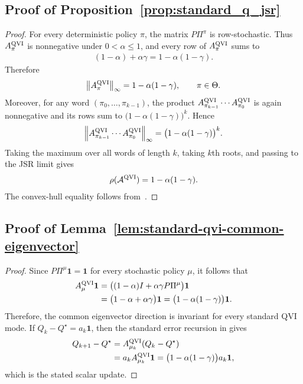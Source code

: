 \documentclass[letterpaper]{article}
\numberwithin{equation}{section}
\begin{document}
\subsection{Proof of Proposition~\ref{prop:standard_q_jsr}}
\label{app:proof-prop-standard-q-jsr}

\begin{proof}
For every deterministic policy $\pi$, the matrix $P\Pi^\pi$ is row-stochastic.
Thus $A_\pi^{\rm QVI}$ is nonnegative under $0<\alpha\le1$, and every row of
$A_\pi^{\rm QVI}$ sums to
\begin{align*}
  (1-\alpha)+\alpha\gamma=1-\alpha(1-\gamma).
\end{align*}
Therefore
\begin{align*}
  \left\lVert A_\pi^{\rm QVI}\right\rVert_\infty
  =1-\alpha(1-\gamma),
  \qquad \pi\in\Theta.
\end{align*}
Moreover, for any word $(\pi_0,\ldots,\pi_{k-1})$, the product
$A_{\pi_{k-1}}^{\rm QVI}\cdots A_{\pi_0}^{\rm QVI}$ is again nonnegative and its
rows sum to $\bigl(1-\alpha(1-\gamma)\bigr)^k$. Hence
\begin{align*}
  \left\lVert A_{\pi_{k-1}}^{\rm QVI}\cdots A_{\pi_0}^{\rm QVI}\right\rVert_\infty
  =\bigl(1-\alpha(1-\gamma)\bigr)^k.
\end{align*}
Taking the maximum over all words of length $k$, taking $k$th roots, and passing
to the JSR limit gives
\begin{align*}
  \rho(\mathcal A^{\rm QVI})=1-\alpha(1-\gamma).
\end{align*}
The convex-hull equality follows from~.
\end{proof}

\subsection{Proof of Lemma~\ref{lem:standard-qvi-common-eigenvector}}
\label{app:proof-lem-standard-qvi-common-eigenvector}

\begin{proof}
Since $P\Pi^\mu\mathbf{1}=\mathbf{1}$ for every stochastic policy $\mu$, it follows that
\begin{align*}
  A_\mu^{\rm QVI}\mathbf{1}
  &=\bigl((1-\alpha)I+\alpha\gamma P\Pi^\mu\bigr)\mathbf{1}\\
  &=\bigl(1-\alpha+\alpha\gamma\bigr)\mathbf{1}
  =\bigl(1-\alpha(1-\gamma)\bigr)\mathbf{1}.
\end{align*}
Therefore, the common eigenvector direction is invariant for every standard QVI mode. If
$Q_k-Q^\star=a_k\mathbf{1}$, then the standard error recursion in
 gives
\begin{align*}
  Q_{k+1}-Q^\star
  &=A_{\mu_k}^{\rm QVI}(Q_k-Q^\star)\\
  &=a_k A_{\mu_k}^{\rm QVI}\mathbf{1}
  =\bigl(1-\alpha(1-\gamma)\bigr)a_k\mathbf{1},
\end{align*}
which is the stated scalar update.
\end{proof}
\end{document}

